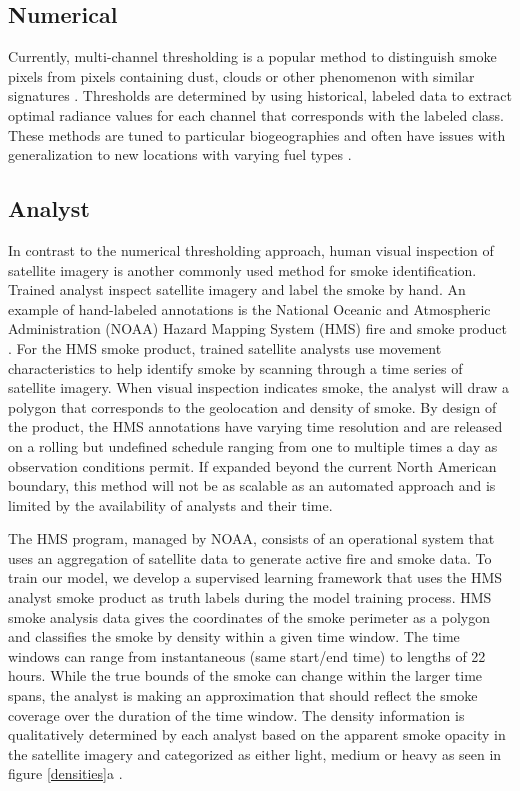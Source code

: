 \documentclass{article}
\begin{document}
\subsection{Numerical}

Currently, multi-channel thresholding is a popular method to distinguish smoke pixels from pixels containing dust, clouds or other phenomenon with similar signatures \cite{threshold}. Thresholds are determined by using historical, labeled data to extract optimal radiance values for each channel that corresponds with the labeled class. These methods are tuned to particular biogeographies and often have issues with generalization to new locations with varying fuel types \cite{thresh_geog}.

\subsection{Analyst} 
In contrast to the numerical thresholding approach, human visual inspection of satellite imagery is another commonly used method for smoke identification. Trained analyst inspect satellite imagery and label the smoke by hand. An example of hand-labeled annotations is the National Oceanic and Atmospheric Administration (NOAA) Hazard Mapping System (HMS) fire and smoke product \cite{hms, hms_val}. For the HMS smoke product, trained satellite analysts use movement characteristics to help identify smoke by scanning through a time series of satellite imagery. When visual inspection indicates smoke, the analyst will draw a polygon that corresponds to the geolocation and density of smoke. By design of the product, the HMS annotations have varying time resolution and are released on a rolling but undefined schedule ranging from one to multiple times a day as observation conditions permit. If expanded beyond the current North American boundary, this method will not be as scalable as an automated approach and is limited by the availability of analysts and their time. 

The HMS program, managed by NOAA, consists of an operational system that uses an aggregation of satellite data to generate active fire and smoke data. To train our model, we develop a supervised learning framework that uses the HMS analyst smoke product as truth labels during the model training process. HMS smoke analysis data gives the coordinates of the smoke perimeter as a polygon and classifies the smoke by density within a given time window. The time windows can range from instantaneous (same start/end time) to lengths of 22 hours. While the true bounds of the smoke can change within the larger time spans, the analyst is making an approximation that should reflect the smoke coverage over the duration of the time window. The density information is qualitatively determined by each analyst based on the apparent smoke opacity in the satellite imagery and categorized as either light, medium or heavy as seen in figure \ref{densities}a \cite{hms_web}.
\end{document}
